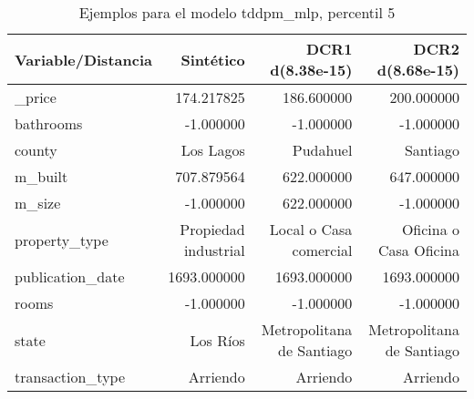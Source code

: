 \begin{table}[H]
\centering
\fontsize{10}{14}\selectfont
\caption{Ejemplos para el modelo tddpm\_mlp, percentil 5}
\label{table-example-economicos-b-2-tddpm_mlp-5p}
\begin{tabular}{|l|r|r|r|}
\hline
\rowcolor[gray]{0.8}
Variable/Distancia & Sintético & DCR1 d(8.38e-15) & DCR2 d(8.68e-15) \\
\hline \_price & \cellcolor[rgb]{0.9, 0.54, 0.52} 174.217825 & 186.600000 & 200.000000 \\
\hline bathrooms & \cellcolor[rgb]{0.9, 0.54, 0.52} -1.000000 & \cellcolor[rgb]{0.9, 0.54, 0.52} -1.000000 & \cellcolor[rgb]{0.9, 0.54, 0.52} -1.000000 \\
\hline county & \cellcolor[rgb]{0.9, 0.54, 0.52} Los Lagos & Pudahuel & Santiago \\
\hline m\_built & \cellcolor[rgb]{0.9, 0.54, 0.52} 707.879564 & 622.000000 & 647.000000 \\
\hline m\_size & \cellcolor[rgb]{0.9, 0.54, 0.52} -1.000000 & 622.000000 & \cellcolor[rgb]{0.9, 0.54, 0.52} -1.000000 \\
\hline property\_type & \cellcolor[rgb]{0.9, 0.54, 0.52} Propiedad industrial & Local o Casa comercial & Oficina o Casa Oficina \\
\hline publication\_date & \cellcolor[rgb]{0.9, 0.54, 0.52} 1693.000000 & \cellcolor[rgb]{0.9, 0.54, 0.52} 1693.000000 & \cellcolor[rgb]{0.9, 0.54, 0.52} 1693.000000 \\
\hline rooms & \cellcolor[rgb]{0.9, 0.54, 0.52} -1.000000 & \cellcolor[rgb]{0.9, 0.54, 0.52} -1.000000 & \cellcolor[rgb]{0.9, 0.54, 0.52} -1.000000 \\
\hline state & \cellcolor[rgb]{0.9, 0.54, 0.52} Los Ríos & Metropolitana de Santiago & Metropolitana de Santiago \\
\hline transaction\_type & \cellcolor[rgb]{0.9, 0.54, 0.52} Arriendo & \cellcolor[rgb]{0.9, 0.54, 0.52} Arriendo & \cellcolor[rgb]{0.9, 0.54, 0.52} Arriendo \\
\hline
\end{tabular}
\end{table}

